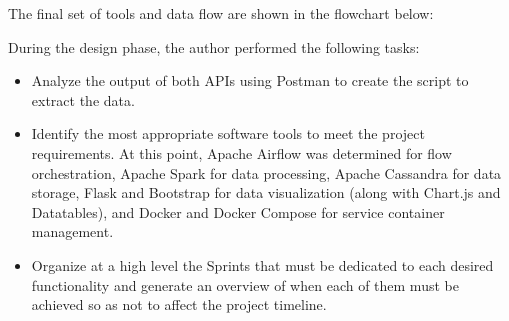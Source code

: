 \nonzeroparskip The final set of tools and data flow are shown in the flowchart below: 

\nonzeroparskip During the design phase, the author performed the following tasks:
\begin{itemize}
	\item Analyze the output of both APIs using Postman to create the script to extract the data.
	\item Identify the most appropriate software tools to meet the project requirements. At this point, Apache Airflow was determined for flow orchestration, Apache Spark for data processing, Apache Cassandra for data storage, Flask and Bootstrap for data visualization (along with Chart.js and Datatables), and Docker and Docker Compose for service container management.
	\item Organize at a high level the Sprints that must be dedicated to each desired functionality and generate an overview of when each of them must be achieved so as not to affect the project timeline.
\end{itemize}

